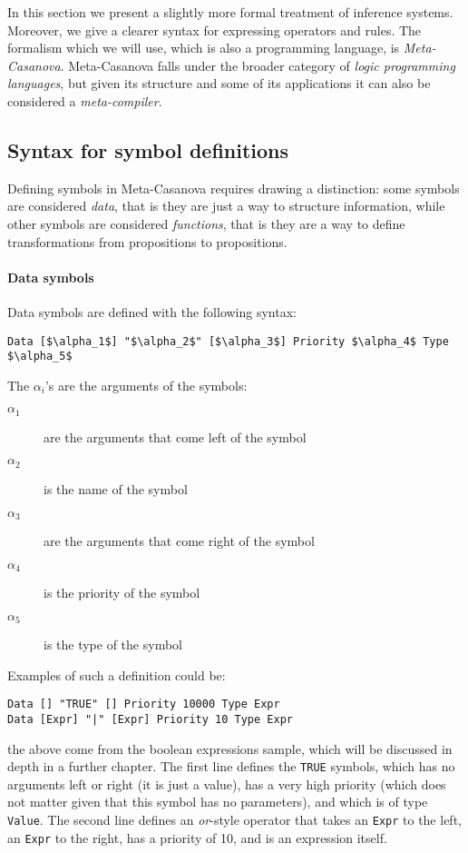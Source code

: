 In this section we present a slightly more formal treatment of inference systems. Moreover, we give a clearer syntax for expressing operators and rules. The formalism which we will use, which is also a programming language, is \textit{Meta-Casanova}. Meta-Casanova falls under the broader category of \textit{logic programming languages}, but given its structure and some of its applications it can also be considered a \textit{meta-compiler}.


\subsection{Syntax for symbol definitions}
Defining symbols in Meta-Casanova requires drawing a distinction: some symbols are considered \textit{data}, that is they are just a way to structure information, while other symbols are considered \textit{functions}, that is they are a way to define transformations from propositions to propositions.

\paragraph{Data symbols}
Data symbols are defined with the following syntax:

\begin{lstlisting}[mathescape=true]
Data [$\alpha_1$] "$\alpha_2$" [$\alpha_3$] Priority $\alpha_4$ Type $\alpha_5$
\end{lstlisting}

The $\alpha_i$'s are the arguments of the symbols:
\begin{description}
\item[$\alpha_1$] are the arguments that come left of the symbol
\item[$\alpha_2$] is the name of the symbol
\item[$\alpha_3$] are the arguments that come right of the symbol
\item[$\alpha_4$] is the priority of the symbol
\item[$\alpha_5$] is the type of the symbol
\end{description}

Examples of such a definition could be:

\begin{lstlisting}
Data [] "TRUE" [] Priority 10000 Type Expr
Data [Expr] "|" [Expr] Priority 10 Type Expr
\end{lstlisting}

the above come from the boolean expressions sample, which will be discussed in depth in a further chapter. The first line defines the \texttt{TRUE} symbols, which has no arguments left or right (it is just a value), has a very high priority (which does not matter given that this symbol has no parameters), and which is of type \texttt{Value}. The second line defines an \textit{or}-style operator that takes an \texttt{Expr} to the left, an \texttt{Expr} to the right, has a priority of 10, and is an expression itself. 

